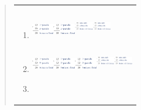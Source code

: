\begin{enumerate}
\begin{escolha}
\begin{enumerate}
\begin{itemize}
\begin{itemize}
\begin{escolha}
\begin{quote}
\begin{escolha}
{\begin{longtable}[]{@{}l@{}}
\begin{itemize}
\begin{enumerate}
\def\labelenumi{\alph{enumi})}
\item
  \includegraphics[width=0.38337in,height=0.31669in]{media/image10.png}\includegraphics[width=0.38337in,height=0.31669in]{media/image10.png}\includegraphics[width=0.31669in,height=0.41670in]{media/image11.png}\includegraphics[width=0.31669in,height=0.41670in]{media/image11.png}
\item
  \includegraphics[width=0.38337in,height=0.31669in]{media/image10.png}\includegraphics[width=0.38337in,height=0.31669in]{media/image10.png}\includegraphics[width=0.38337in,height=0.31669in]{media/image10.png}\includegraphics[width=0.31669in,height=0.41670in]{media/image11.png}\includegraphics[width=0.31669in,height=0.41670in]{media/image11.png}
\item

\end{enumerate}
\end{itemize}
\end{longtable}}
\end{escolha}
\end{quote}
\end{escolha}
\end{itemize}
\end{itemize}
\end{enumerate}
\end{escolha}
\end{enumerate}
